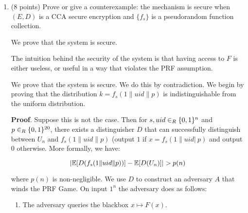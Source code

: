 \documentclass{article}
\begin{document}
\begin{enumerate}[,label=\alph*.]%

\item{}
(8 points) Prove or give a counterexample: the mechanism is secure when $(E,D)$ is a CCA secure encryption and $\{ f_s \}$ is a pseudorandom function collection.%

We prove that the system is secure.%

The intuition behind the security of the system is that having access to $F$ is either useless, or
useful in a way that violates the PRF assumption.%

We prove that the system is secure. We do this by contradiction. We begin by proving that the 
distribution $k = f_s(1 \| uid \| p)$ is indistinguishable from the uniform distribution.%

\begin{mdbmarginx}{1ex}{0pt}{1ex}{0pt}%
\noindent{}\textbf{Proof}.  Suppose this is not the case. Then for $s,uid \in_R \{0,1\}^n$ and $p \in_R \{0,1\}^{20}$, there exists a distinguisher
$D$ that can successfully distinguish between $U_n$ and $f_s(1 \| uid \| p)$ (output $1$ if $x = f_s(1 \| uid |\ p)$ 
and output $0$ otherwise. More formally, we have:%
\end{mdbmarginx}%
\noindent\noindent\[%
 |\E[D(f_s(1 \| uid \| p))] - \E[D(U_n)]| > p(n)
\]%

where $p(n)$ is non-negligible. 
We use $D$ to construct
an adversary $A$ that winds the PRF Game. On input $1^n$ the adversary does as follows:%

\begin{enumerate}[noitemsep,topsep=\mdcompacttopsep]%

\item{}The adversary queries the blackbox $x \mapsto F(x)$.%


\end{enumerate}
\end{enumerate}
\end{document}
